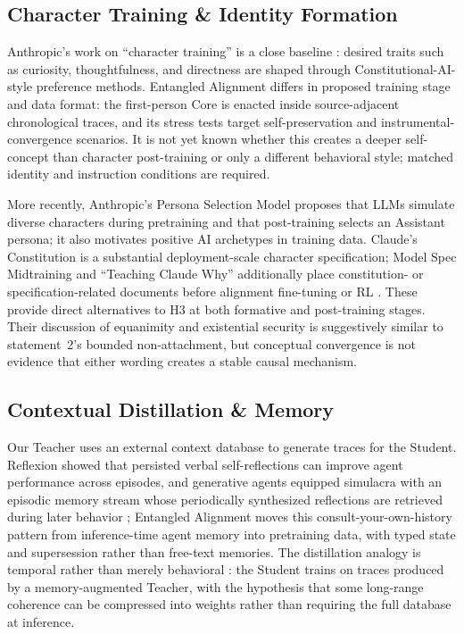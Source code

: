 \subsection{Character Training \& Identity Formation}

Anthropic's work on ``character training'' is a close baseline
\cite{anthropic2024character}: desired traits such as curiosity, thoughtfulness,
and directness are shaped through Constitutional-AI-style preference methods.
Entangled Alignment differs in proposed training stage and data format: the
first-person Core is enacted inside source-adjacent chronological traces, and
its stress tests target self-preservation and instrumental-convergence
scenarios. It is not yet known whether this creates a deeper self-concept than
character post-training or only a different behavioral style; matched identity
and instruction conditions are required.

More recently, Anthropic's Persona Selection Model \cite{marks2026psm} proposes
that LLMs simulate diverse characters during pretraining and that post-training
selects an Assistant persona; it also motivates positive AI archetypes in
training data. Claude's Constitution \cite{askell2026claude} is a substantial
deployment-scale character specification; Model Spec Midtraining and
``Teaching Claude Why'' additionally place constitution- or
specification-related documents before alignment fine-tuning or RL
\cite{li2026modelspec,kutasov2026teachingclaudewhy}. These provide direct
alternatives to H3 at both formative and post-training stages. Their discussion
of equanimity and existential security is suggestively similar to statement~2's
bounded non-attachment, but conceptual convergence is not evidence that either
wording creates a stable causal mechanism.

\subsection{Contextual Distillation \& Memory}

Our Teacher uses an external context database to generate traces for the
Student. Reflexion \cite{shinn2023reflexion} showed that persisted verbal
self-reflections can improve agent performance across episodes, and generative
agents equipped simulacra with an episodic memory stream whose periodically
synthesized reflections are retrieved during later behavior
\cite{park2023generative}; Entangled Alignment moves this
consult-your-own-history pattern from inference-time agent memory into
pretraining data, with typed state and supersession rather than free-text
memories. The
distillation analogy is temporal rather than merely behavioral
\cite{hinton2015distilling}: the Student trains on traces produced by a
memory-augmented Teacher, with the hypothesis that some long-range coherence
can be compressed into weights rather than requiring the full database at
inference.

